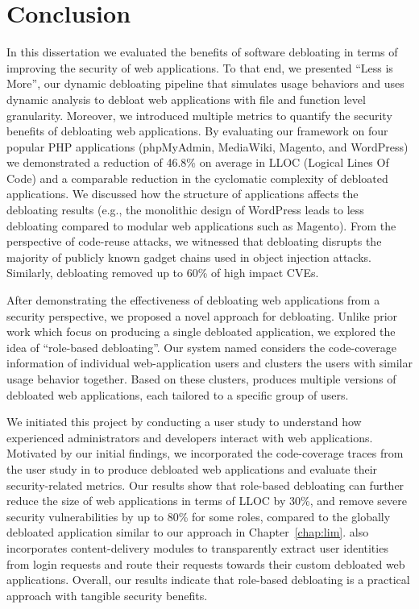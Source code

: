 \chapter{Conclusion}
\label{chap:conclusion}

In this dissertation we evaluated the benefits of software debloating in terms of improving the security of web applications. 
To that end, we presented ``Less is More'', our dynamic debloating pipeline that simulates usage behaviors and uses dynamic analysis to debloat web applications with file and function level granularity. 
Moreover, we introduced multiple metrics to quantify the security benefits of debloating web applications. 
By evaluating our framework on four popular PHP applications (phpMyAdmin, MediaWiki, Magento, and WordPress) we demonstrated a reduction of 46.8\% on average in LLOC (Logical Lines Of Code) and a comparable reduction in the cyclomatic complexity of debloated applications. 
We discussed how the structure of applications affects the debloating results (e.g., the monolithic design of WordPress leads to less debloating compared to modular web applications such as Magento). 
From the perspective of code-reuse attacks, we witnessed that debloating disrupts the majority of publicly known gadget chains used in object injection attacks. 
Similarly, debloating removed up to 60\% of high impact CVEs. 

After demonstrating the effectiveness of debloating web applications from a security perspective, we proposed a novel approach for debloating. 
Unlike prior work which focus on producing a single debloated application, we explored the idea of ``role-based debloating''. 
Our system named \dbltr{} considers the code-coverage information of individual web-application users and clusters the users with similar usage behavior together. 
Based on these clusters, \dbltr{} produces multiple versions of debloated web applications, each tailored to a specific group of users. 

We initiated this project by conducting a user study to understand how experienced administrators and developers interact with web applications. 
Motivated by our initial findings, we incorporated the code-coverage traces from the user study in \dbltr{} to produce debloated web applications and evaluate their security-related metrics. 
Our results show that role-based debloating can further reduce the size of web applications in terms of LLOC by 30\%, and remove severe security vulnerabilities by up to 80\% for some roles, compared to the globally debloated application similar to our approach in Chapter~\ref{chap:lim}. 
\dbltr{} also incorporates content-delivery modules to transparently extract user identities from login requests and route their requests towards their custom debloated web applications. 
Overall, our results indicate that role-based debloating is a practical approach with tangible security benefits. 

